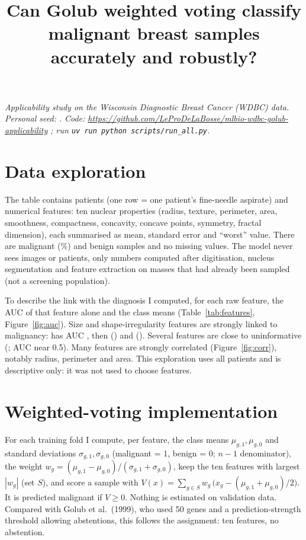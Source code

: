 \documentclass[10pt,a4paper]{article}
\title{Can Golub weighted voting classify malignant breast samples accurately and robustly?}
\author{}
\date{}
\begin{document}
\maketitle
\vspace{-2.5em}
\emph{Applicability study on the Wisconsin Diagnostic Breast Cancer (WDBC) data. Personal seed: \textbf{\seed}.}
\newline
\emph{Code: \url{https://github.com/LeProDeLaBosse/mlbio-wdbc-golub-applicability} ; run \texttt{uv run python scripts/run\_all.py}.}

\section{Data exploration}
The table contains \nsamples{} patients (one row = one patient's fine-needle aspirate) and \nfeatures{} numerical features:
ten nuclear properties (radius, texture, perimeter, area, smoothness, compactness, concavity, concave points, symmetry,
fractal dimension), each summarised as mean, standard error and ``worst'' value. There are \nmal{} malignant (\pctmal\%) and
\nben{} benign samples and no missing values. The model never sees images or patients, only numbers computed after digitisation,
nucleus segmentation and feature extraction on masses that had already been sampled (not a screening population).

To describe the link with the diagnosis I computed, for each raw feature, the AUC of that feature alone and the class means
(Table~\ref{tab:features}, Figure~\ref{fig:auc}). Size and shape-irregularity features are strongly linked to malignancy:
\texttt{\topA} has AUC \topAauc, then \texttt{\topB} (\topBauc) and \texttt{\topC} (\topCauc). Several features are close to
uninformative (\nearhalf; AUC near 0.5). Many features are strongly correlated (Figure~\ref{fig:corr}), notably radius,
perimeter and area. This exploration uses all patients and is descriptive only: it was not used to choose features.

\section{Weighted-voting implementation}
For each training fold I compute, per feature, the class means $\mu_{g,1},\mu_{g,0}$ and standard deviations
$\sigma_{g,1},\sigma_{g,0}$ (malignant = 1, benign = 0; $n-1$ denominator), the weight
$w_g=(\mu_{g,1}-\mu_{g,0})/(\sigma_{g,1}+\sigma_{g,0})$, keep the ten features with largest $|w_g|$ (set $S$), and score a sample
with $V(x)=\sum_{g\in S} w_g\,\bigl(x_g-(\mu_{g,1}+\mu_{g,0})/2\bigr)$. It is predicted malignant if $V\ge 0$. Nothing is
estimated on validation data. Compared with Golub et al.\ (1999), who used 50 genes and a prediction-strength threshold allowing
abstentions, this follows the assignment: ten features, no abstention.
\end{document}
